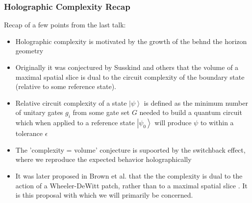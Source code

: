 \documentclass[8pt,aspectratio=169]{beamer}
\newcommand{\ket}[1]{\left| #1 \right>}
\begin{document}
\begin{frame}
\frametitle{Holographic Complexity Recap}

Recap of a few points from the last talk:

\begin{itemize}

\item Holographic complexity is motivated by the growth of the behnd the horizon geometry \cite{Susskind:2014moa}

\item Originally it was conjectured by Susskind and others \cite{Susskind:2014moa,Susskind:2014rva} that the volume of a maximal spatial slice is dual to the circuit complexity of the boundary state (relative to some reference state).

\item Relative circuit complexity of a state $\ket{\psi}$ is defined as the minimum number of unitary gates $g_i$ from some gate set $G$ needed to build a quantum circuit which when applied to a reference state $\ket{\psi_0}$ will produce $\psi$ to within a tolerance $\epsilon$

\item The 'complexity = volume' conjecture is supoorted by the switchback effect, where we reproduce the expected behavior holographically \cite{Stanford:2014jda, Susskind:2014jwa}

\item It was later proposed in Brown et al. that the the complexity is dual to the action of a Wheeler-DeWitt patch, rather than to a maximal spatial slice \cite{Brown:2015bva,Brown:2015lvg}. It is this proposal with which we will primarily be concerned.

\end{itemize}

\end{frame}
\end{document}
